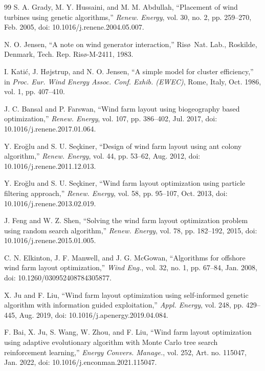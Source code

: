 {\begin{thebibliography}{99}
S. A. Grady, M. Y. Hussaini, and M. M. Abdullah, ``Placement of wind turbines using genetic algorithms,'' \textit{Renew. Energy}, vol. 30, no. 2, pp. 259--270, Feb. 2005, doi: 10.1016/j.renene.2004.05.007.

N. O. Jensen, ``A note on wind generator interaction,'' Ris\o\ Nat. Lab., Roskilde, Denmark, Tech. Rep. Ris\o-M-2411, 1983.

I. Kati\'c, J. H\o jstrup, and N. O. Jensen, ``A simple model for cluster efficiency,'' in \textit{Proc. Eur. Wind Energy Assoc. Conf. Exhib. (EWEC)}, Rome, Italy, Oct. 1986, vol. 1, pp. 407--410.

J. C. Bansal and P. Farswan, ``Wind farm layout using biogeography based optimization,'' \textit{Renew. Energy}, vol. 107, pp. 386--402, Jul. 2017, doi: 10.1016/j.renene.2017.01.064.

Y. Ero\u{g}lu and S. U. Se\c{c}kiner, ``Design of wind farm layout using ant colony algorithm,'' \textit{Renew. Energy}, vol. 44, pp. 53--62, Aug. 2012, doi: 10.1016/j.renene.2011.12.013.

Y. Ero\u{g}lu and S. U. Se\c{c}kiner, ``Wind farm layout optimization using particle filtering approach,'' \textit{Renew. Energy}, vol. 58, pp. 95--107, Oct. 2013, doi: 10.1016/j.renene.2013.02.019.

J. Feng and W. Z. Shen, ``Solving the wind farm layout optimization problem using random search algorithm,'' \textit{Renew. Energy}, vol. 78, pp. 182--192, 2015, doi: 10.1016/j.renene.2015.01.005.

C. N. Elkinton, J. F. Manwell, and J. G. McGowan, ``Algorithms for offshore wind farm layout optimization,'' \textit{Wind Eng.}, vol. 32, no. 1, pp. 67--84, Jan. 2008, doi: 10.1260/030952408784305877.

X. Ju and F. Liu, ``Wind farm layout optimization using self-informed genetic algorithm with information guided exploitation,'' \textit{Appl. Energy}, vol. 248, pp. 429--445, Aug. 2019, doi: 10.1016/j.apenergy.2019.04.084.

F. Bai, X. Ju, S. Wang, W. Zhou, and F. Liu, ``Wind farm layout optimization using adaptive evolutionary algorithm with Monte Carlo tree search reinforcement learning,'' \textit{Energy Convers. Manage.}, vol. 252, Art. no. 115047, Jan. 2022, doi: 10.1016/j.enconman.2021.115047.


\end{thebibliography}}
